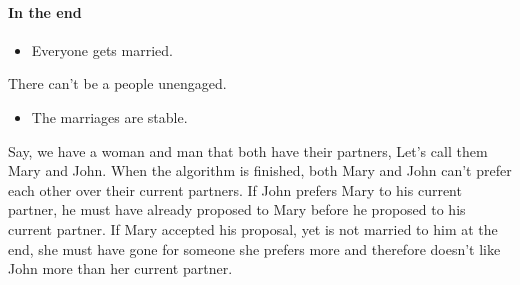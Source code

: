 \paragraph{In the end}
\begin{itemize}
	\item Everyone gets married.
\end{itemize}
There can't be a people unengaged.\newline 
\begin{itemize}
	\item The marriages are stable.
\end{itemize}
Say, we have a woman and man that both have their partners, Let's call them Mary and John.
When the algorithm is finished, both Mary and John can't prefer each other over their current partners. If John prefers Mary to his current partner, he must have already proposed to Mary before he proposed to his current partner. If Mary accepted his proposal, yet is not married to him at the end, she must have gone for someone she prefers more and therefore doesn't like John more than her current partner. 

\newpage
